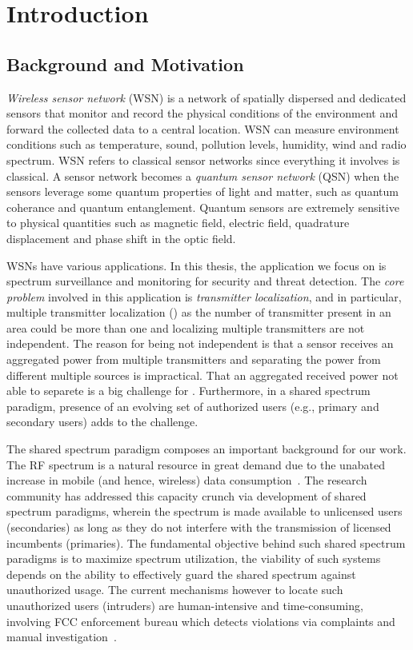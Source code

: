 \chapter{Introduction}
\label{chap:intro}

\section{Background and Motivation}

\emph{Wireless sensor network} (WSN) is a network of spatially dispersed and dedicated sensors that monitor and record the 
physical conditions of the environment and forward the collected data to a central location.
WSN can measure environment conditions such as temperature, sound, pollution levels, humidity, wind and radio spectrum.
WSN refers to classical sensor networks since everything it involves is classical.
A sensor network becomes a \emph{quantum sensor network} (QSN) when the sensors leverage some quantum properties of light and matter, 
such as quantum coherance and quantum entanglement.
Quantum sensors are extremely sensitive to physical quantities such as magnetic field, electric field, quadrature displacement
and phase shift in the optic field.

 WSNs have various applications.
In this thesis, the application we focus on is spectrum surveillance and monitoring for security and threat detection.
The \emph{core problem} involved in this application is \emph{transmitter localization}, and in particular, multiple transmitter localization (\mtl) as 
the number of transmitter present in an area could be more than one and localizing multiple transmitters are not independent.
The reason for being not independent is that a sensor receives an aggregated power from multiple transmitters and separating 
the power from different multiple sources is impractical.
That an aggregated received power not able to separete is a big challenge for \mtl.
Furthermore, in a shared spectrum paradigm, presence of an evolving set of authorized users 
(e.g., primary and secondary users) adds to the challenge.

The shared spectrum paradigm composes an important background for our \mtl work.
The RF spectrum is a natural resource in great demand due to the unabated increase in mobile (and hence, wireless) data consumption~\cite{Jeffrey14}. 
The research community has addressed this capacity crunch via development of shared spectrum paradigms, wherein the spectrum 
is made available to unlicensed users (secondaries) as long as they do not interfere with the transmission of licensed incumbents (primaries).
The fundamental objective behind such shared spectrum paradigms is to maximize spectrum utilization,
the viability of such systems depends on the ability to effectively guard the shared spectrum against unauthorized usage. 
The current mechanisms however to locate such unauthorized users (intruders) are human-intensive and time-consuming, 
involving FCC enforcement bureau which detects violations via complaints and manual investigation~\cite{mobicom17-splot}. 


